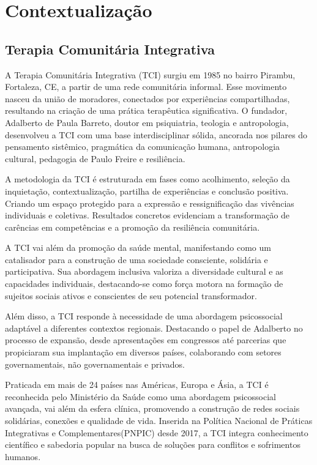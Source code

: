 \part{Contextualização}

\chapter{Terapia Comunitária Integrativa}
A Terapia Comunitária Integrativa (TCI) surgiu em 1985 no bairro Pirambu, Fortaleza, CE, a partir de uma rede comunitária informal. Esse movimento nasceu da união de moradores, conectados por experiências compartilhadas, resultando na criação de uma prática terapêutica significativa. O fundador, Adalberto de Paula Barreto, doutor em psiquiatria, teologia e antropologia, desenvolveu a TCI com uma base interdisciplinar sólida, ancorada nos pilares do pensamento sistêmico, pragmática da comunicação humana, antropologia cultural, pedagogia de Paulo Freire e resiliência.\cite{BARRETO}

A metodologia da TCI é estruturada em fases como acolhimento, seleção da inquietação, contextualização, partilha de experiências e conclusão positiva. Criando um espaço protegido para a expressão e ressignificação das vivências individuais e coletivas. Resultados concretos evidenciam a transformação de carências em competências e a promoção da resiliência comunitária. \cite{SILVA}

A TCI vai além da promoção da saúde mental, manifestando como um catalisador para a construção de uma sociedade consciente, solidária e participativa. Sua abordagem inclusiva valoriza a diversidade cultural e as capacidades individuais, destacando-se como força motora na formação de sujeitos sociais ativos e conscientes de seu potencial transformador.\cite{BARRETO}

Além disso, a TCI responde à necessidade de uma abordagem psicossocial adaptável a diferentes contextos regionais. Destacando o papel de Adalberto no processo de expansão, desde apresentações em congressos até parcerias que propiciaram sua implantação em diversos países, colaborando com setores governamentais, não governamentais e privados.\cite{GOMES}

Praticada em mais de 24 países nas Américas, Europa e Ásia, a TCI é reconhecida pelo Ministério da Saúde como uma abordagem psicossocial avançada, vai além da esfera clínica, promovendo a construção de redes sociais solidárias, conexões e qualidade de vida. Inserida na Política Nacional de Práticas Integrativas e Complementares(PNPIC) desde 2017, a TCI integra conhecimento científico e sabedoria popular na busca de soluções para conflitos e sofrimentos humanos.\cite{ABRATECOM}


